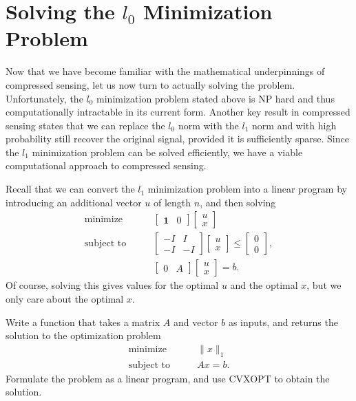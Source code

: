 \section*{Solving the $l_0$ Minimization Problem}
Now that we have become familiar with the mathematical underpinnings of compressed sensing, let us now turn to 
actually solving the problem. Unfortunately, the $l_0$ minimization problem stated above is NP hard and thus 
computationally intractable in its current form. Another key result in compressed sensing states that we can
replace the $l_0$ norm with the $l_1$ norm and with high probability still recover the original signal, provided
it is sufficiently sparse. Since the $l_1$ minimization problem can be solved efficiently, we have a viable 
computational approach to compressed sensing. 

Recall that we can convert the $l_1$ minimization problem into a linear program by introducing an additional
vector $u$ of length $n$, and then solving
\begin{align*}
\text{minimize}\qquad 
&\begin{bmatrix}
\mathbf{1} & 0
\end{bmatrix}
\begin{bmatrix}
u \\
x
\end{bmatrix}\\
\text{subject to}\qquad
&\begin{bmatrix}
-I & I\\
-I & -I
\end{bmatrix}
\begin{bmatrix}
u \\
x
\end{bmatrix}
\leq 
\begin{bmatrix}
0\\
0
\end{bmatrix},\\
&\begin{bmatrix}
0 & A
\end{bmatrix}
\begin{bmatrix}
u \\
x
\end{bmatrix}
= 
b.
\end{align*}
Of course, solving this gives values for the optimal $u$ and the optimal $x$, but we only care about the optimal $x$.

\begin{problem}
Write a function  that takes a matrix $A$ and vector $b$ as inputs, and returns the solution to the 
optimization problem 
\begin{align*}
\text{minimize}\qquad &\|x\|_1\\
\text{subject to} \qquad &Ax = b.
\end{align*}
Formulate the problem as a linear program, and use CVXOPT to obtain the solution.
\end{problem}

